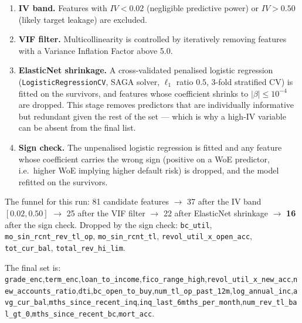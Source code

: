 \documentclass[11pt,a4paper]{article}
\begin{document}
\begin{enumerate}
    \item \textbf{IV band.} Features with $IV < 0.02$ (negligible predictive power) or $IV > 0.50$ (likely target leakage) are excluded.
    \item \textbf{VIF filter.} Multicollinearity is controlled by iteratively removing features with a Variance Inflation Factor above 5.0.
    \item \textbf{ElasticNet shrinkage.} A cross-validated penalised logistic regression (\texttt{LogisticRegressionCV}, SAGA solver, $\ell_1$ ratio $0.5$, 3-fold stratified CV) is fitted on the survivors, and features whose coefficient shrinks to $|\beta| \le 10^{-4}$ are dropped. This stage removes predictors that are individually informative but redundant given the rest of the set --- which is why a high-IV variable can be absent from the final list.
    \item \textbf{Sign check.} The unpenalised logistic regression is fitted and any feature whose coefficient carries the wrong sign (positive on a WoE predictor, i.e.\ higher WoE implying higher default risk) is dropped, and the model refitted on the survivors.
\end{enumerate}

\noindent The funnel for this run: 81 candidate features $\rightarrow$ 37 after the IV band $[0.02, 0.50]$ $\rightarrow$ 25 after the VIF filter $\rightarrow$ 22 after ElasticNet shrinkage $\rightarrow$ \textbf{16} after the sign check. Dropped by the sign check: \texttt{bc\_util}, \texttt{mo\_sin\_rcnt\_rev\_tl\_op}, \texttt{mo\_sin\_rcnt\_tl}, \texttt{revol\_util\_x\_open\_acc}, \texttt{tot\_cur\_bal}, \texttt{total\_rev\_hi\_lim}.

\begin{sloppypar}\noindent
The final set is: \texttt{grade\_enc},\allowbreak \texttt{term\_enc},\allowbreak \texttt{loan\_to\_income},\allowbreak \texttt{fico\_range\_high},\allowbreak \texttt{revol\_util\_x\_new\_acc},\allowbreak \texttt{new\_accounts\_ratio},\allowbreak \texttt{dti},\allowbreak \texttt{bc\_open\_to\_buy},\allowbreak \texttt{num\_tl\_op\_past\_12m},\allowbreak \texttt{log\_annual\_inc},\allowbreak \texttt{avg\_cur\_bal},\allowbreak \texttt{mths\_since\_recent\_inq},\allowbreak \texttt{inq\_last\_6mths\_per\_month},\allowbreak \texttt{num\_rev\_tl\_bal\_gt\_0},\allowbreak \texttt{mths\_since\_recent\_bc},\allowbreak \texttt{mort\_acc}.
\end{sloppypar}
\end{document}
